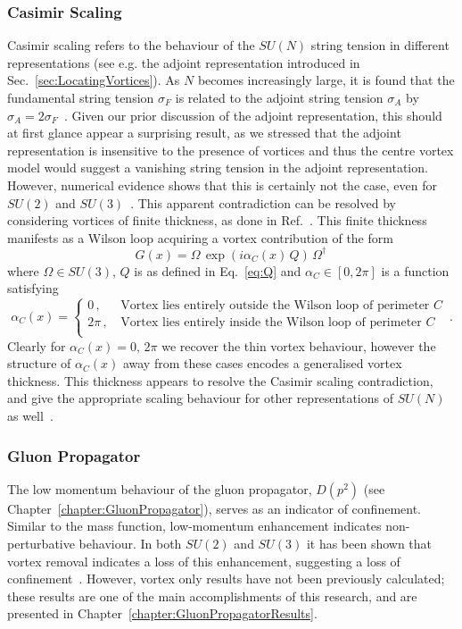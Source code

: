 \subsubsection{Casimir Scaling}
Casimir scaling refers to the behaviour of the $SU(N)$ string tension in different representations (see e.g. the adjoint representation introduced in Sec.~\ref{sec:LocatingVortices}). As $N$ becomes increasingly large, it is found that the fundamental string tension $\sigma_F$ is related to the adjoint string tension $\sigma_A$ by $\sigma_A = 2\sigma_F$~\cite{Greensite:1982be}. Given our prior discussion of the adjoint representation, this should at first glance appear a surprising result, as we stressed that the adjoint representation is insensitive to the presence of vortices and thus the centre vortex model would suggest a vanishing string tension in the adjoint representation. However, numerical evidence shows that this is certainly not the case, even for $SU(2)$ and $SU(3)$~\cite{Ambjorn:1984mb,Ambjorn:1984dp,Campbell:1985kp}. This apparent contradiction can be resolved by considering vortices of finite thickness, as done in Ref.~\cite{Faber:1997rp}. This finite thickness manifests as a Wilson loop acquiring a vortex contribution of the form
%
\begin{equation}
G(x) = \Omega\,\exp\left(i \alpha_C(x)\,Q\right)\, \Omega^\dagger\,
\end{equation}
%
where $\Omega\in SU(3)$, $Q$ is as defined in Eq.~\ref{eq:Q} and $\alpha_C\in [0,2\pi]$ is a function satisfying
%
\begin{equation}
\alpha_C(x)=
\begin{cases}
0\, , &\, \text{Vortex lies entirely outside the Wilson loop of perimeter $C$}\\
2\pi\, , &\, \text{Vortex lies entirely inside the Wilson loop of perimeter $C$}\\
\end{cases}\, .
\end{equation}
%
Clearly for $\alpha_C(x) = 0,\,2\pi$ we recover the thin vortex behaviour, however the structure of $\alpha_C(x)$ away from these cases encodes a generalised vortex thickness. This thickness appears to resolve the Casimir scaling contradiction, and give the appropriate scaling behaviour for other representations of $SU(N)$ as well~\cite{Faber:1997rp}.

\subsubsection{Gluon Propagator}
The low momentum behaviour of the gluon propagator, $D(p^2)$ (see Chapter~\ref{chapter:GluonPropagator}), serves as an indicator of confinement. Similar to the mass function, low-momentum enhancement indicates non-perturbative behaviour. In both $SU(2)$ and $SU(3)$ it has been shown that vortex removal indicates a loss of this enhancement, suggesting a loss of confinement~\cite{Bowman:2010zr,Langfeld:2001cz,Quandt:2010yq}. However, vortex only results have not been previously calculated; these results are one of the main accomplishments of this research, and are presented in Chapter~\ref{chapter:GluonPropagatorResults}.


